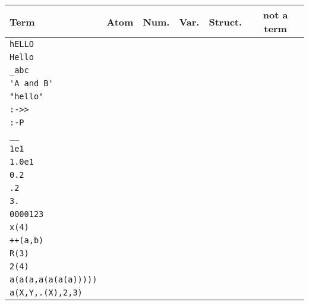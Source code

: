 \def\OK{\only<2->{\color{green!50!black}$\surd$}}

\begin{frame}[fragile]
\scriptsize

\begin{tabular}{|l|c|c|c|c|c|}\hline
\rowcolor{blue!40!white}
Term  & Atom & Num. & Var. & Struct. & not a term \\ \hline
\lstinline!hELLO!  & \OK    &       &       &       	&	\\ \hline
\lstinline!Hello!  &     &       & \OK      &       	&	\\ \hline
\lstinline!_abc!  &     &       &   \OK     &       	&	\\ \hline
\lstinline!'A and B'!  &  \OK    &       &       &       	&	\\ \hline
\lstinline!"hello"! &   &   &   &  \OK  &   \\ \hline
\lstinline!:->>!   &  \OK    &       &       &       	&	\\ \hline
\lstinline!:-P!    &     &       &       &       	&\OK 	\\ \hline
\lstinline!__!  &     &       &  \OK      &       	&	\\ \hline
\lstinline!1e1!  &     &  \OK      &       &       	& 	\\ \hline
\lstinline!1.0e1!  &     &   \OK     &       &       	&	\\ \hline
\lstinline!0.2!  &     &  \OK      &       &       	&	\\ \hline
\lstinline!.2!  &     &       &       &       	&\OK 	\\ \hline
\lstinline!3.!  &     &       &       &       	&\OK 	\\ \hline
\lstinline!0000123!  &     &   \OK    &       &       	& 	\\ \hline
\lstinline!x(4)!  &     &       &       &  \OK      	&	\\ \hline
\lstinline!++(a,b)!  &     &       &       & \OK       	&	\\ \hline
\lstinline!R(3)!  &     &       &       &       	&	\OK \\ \hline
\lstinline!2(4)!  &     &       &       &       	&\OK 	\\ \hline
\lstinline!a(a(a,a(a(a(a)))))!  &     &       &   \OK     &       	&	\\ \hline
\lstinline!a(X,Y,.(X),2,3)!  &     &       &       &     \OK   	&	\\ \hline
\end{tabular}
\end{frame}

